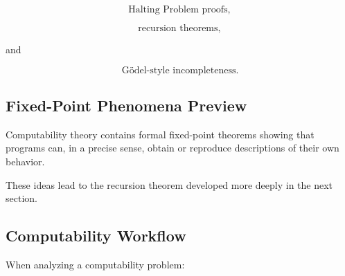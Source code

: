 \[
\boxed{
\text{Halting Problem proofs},
}
\]

\[
\boxed{
\text{recursion theorems},
}
\]

and

\[
\boxed{
\text{Gödel-style incompleteness}.
}
\]

\subsection{Fixed-Point Phenomena Preview}
\label{subsec:computability-fixed-point-preview}

Computability theory contains formal fixed-point theorems showing that
programs can, in a precise sense, obtain or reproduce descriptions of their
own behavior.

These ideas lead to the recursion theorem developed more deeply in the
next section.

\subsection{Computability Workflow}
\label{subsec:computability-workflow}

When analyzing a computability problem:

